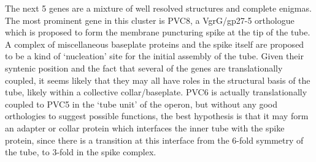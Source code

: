 The next 5 genes are a mixture of well resolved structures and complete enigmas. The most prominent gene in this cluster is PVC8, a VgrG/gp27-5 orthologue which is proposed to form the membrane puncturing spike at the tip of the tube. A complex of miscellaneous baseplate proteins and the spike itself are proposed to be a kind of `nucleation' site for the initial assembly of the tube. Given their syntenic position and the fact that several of the genes are translationally coupled, it seems likely that they may all have roles in the structural basis of the tube, likely within a collective collar/baseplate. PVC6 is actually translationally coupled to PVC5 in the `tube unit' of the operon, but without any good orthologies to suggest possible functions, the best hypothesis is that it may form an adapter or collar protein which interfaces the inner tube with the spike protein, since there is a transition at this interface from the 6-fold symmetry of the tube, to 3-fold in the spike complex.


